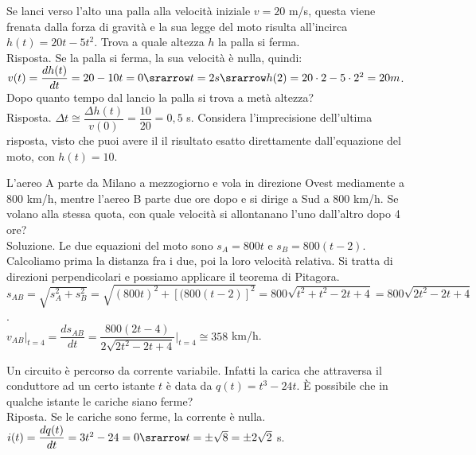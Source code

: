 \begin{esempio}
 Se lanci verso l'alto una palla alla velocità iniziale $v=20$ m/s, questa viene 
 frenata dalla forza di gravità e la sua legge del moto risulta all'incirca 
 $h(t)=20t-5t^2$. Trova a quale altezza $h$ la palla si ferma.\\
 Risposta. Se la palla si ferma, la sua velocità è nulla, quindi:\\
 $v(t)=\dfrac{dh(t)}{dt}= 20-10t=0\srarrow t=2 s \srarrow h(2)=20\cdot 2-5\cdot 
 2^2=20 m$.\\
 Dopo quanto tempo dal lancio la palla si trova a metà altezza?\\
 Risposta. $\Delta t\cong \dfrac{\Delta h(t)}{v(0)}=\dfrac{10}{20}=0,5$ s.
 Considera l'imprecisione dell'ultima risposta, visto che puoi avere il
 il risultato esatto direttamente dall'equazione del moto, con $h(t)=10$.
\end{esempio}

\begin{esempio}
L'aereo A parte da Milano a mezzogiorno e vola in direzione Ovest mediamente a 
$800$ km/h, mentre l'aereo B parte due ore dopo e si dirige a Sud a $800$ km/h.
Se volano alla stessa quota, con quale velocità si allontanano l'uno dall'altro
dopo 4 ore?\\
Soluzione. Le due equazioni del moto sono $s_A=800t$ e $s_B=800(t-2)$. 
Calcoliamo prima la distanza fra i due, poi la loro velocità relativa.
Si tratta di direzioni perpendicolari e possiamo applicare il teorema di 
Pitagora.\\
$s_{AB}=\sqrt{s_A^2+s_B^2}=\sqrt{(800t)^2+[(800(t-2)]^2}=
800\sqrt{t^2+t^2-2t+4}=800\sqrt{2t^2-2t+4}$.\\
$v_{AB}|_{t=4}=\dfrac{ds_{AB}}{dt}=\dfrac{800(2t-4)}{2\sqrt{2t^2-2t+4}}
\bigg|_{t=4}\cong 358$ km/h.
\end{esempio}

\begin{esempio}
 Un circuito è percorso da corrente variabile. Infatti la carica che attraversa
il conduttore ad un certo istante $t$ è data da $q(t)=t^3-24t$. È possibile che in
qualche istante le cariche siano ferme?\\
Riposta. Se le cariche sono ferme, la corrente è nulla.\\ 
$i(t)=\dfrac{dq(t)}{dt}=3t^2-24=0\srarrow t=\pm\sqrt{8}=\pm2\sqrt{2}$ s.\\
\end{esempio}

